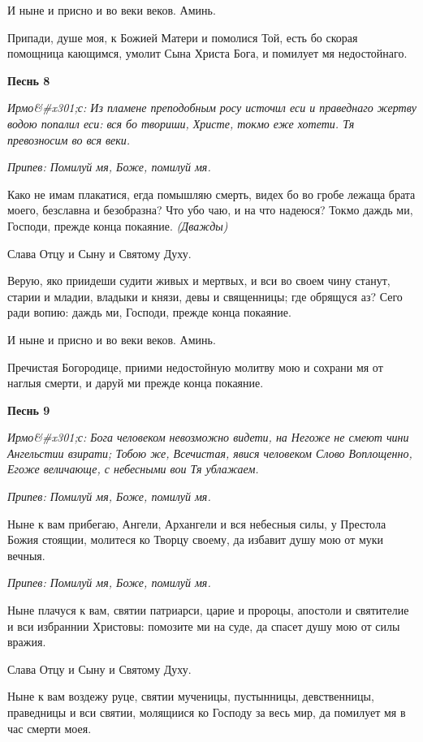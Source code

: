 И ныне и присно и во веки веков. Аминь.


Припади, душе моя, к Божией Матери и помолися Той, есть бо скорая помощница кающимся, умолит Сына Христа Бога, и помилует мя недостойнаго.




\bfseries Песнь 8\normalfont{}


\itshape Ирмо&#x301;с:\normalfont{} Из пламене преподобным росу источил еси и праведнаго жертву водою попалил еси: вся бо твориши, Христе, токмо еже хотети. Тя превозносим во вся веки.


\itshape Припев:\normalfont{} Помилуй мя, Боже, помилуй мя.


Како не имам плакатися, егда помышляю смерть, видех бо во гробе лежаща брата моего, безславна и безобразна? Что убо чаю, и на что надеюся? Токмо даждь ми, Господи, прежде конца покаяние. \itshape (Дважды)\normalfont{}


Слава Отцу и Сыну и Святому Духу.


Верую, яко приидеши судити живых и мертвых, и вси во своем чину станут, старии и младии, владыки и князи, девы и священницы; где обрящуся аз? Сего ради вопию: даждь ми, Господи, прежде конца покаяние.


И ныне и присно и во веки веков. Аминь.


Пречистая Богородице, приими недостойную молитву мою и сохрани мя от наглыя смерти, и даруй ми прежде конца покаяние.




\bfseries Песнь 9\normalfont{}


\itshape Ирмо&#x301;с:\normalfont{} Бога человеком невозможно видети, на Негоже не смеют чини Ангельстии взирати; Тобою же, Всечистая, явися человеком Слово Воплощенно, Егоже величающе, с небесными вои Тя ублажаем.


\itshape Припев:\normalfont{} Помилуй мя, Боже, помилуй мя.


Ныне к вам прибегаю, Ангели, Архангели и вся небесныя силы, у Престола Божия стоящии, молитеся ко Творцу своему, да избавит душу мою от муки вечныя.


\itshape Припев:\normalfont{} Помилуй мя, Боже, помилуй мя.


Ныне плачуся к вам, святии патриарси, царие и пророцы, апостоли и святителие и вси избраннии Христовы: помозите ми на суде, да спасет душу мою от силы вражия.


Слава Отцу и Сыну и Святому Духу.


Ныне к вам воздежу руце, святии мученицы, пустынницы, девственницы, праведницы и вси святии, молящиися ко Господу за весь мир, да помилует мя в час смерти моея.


